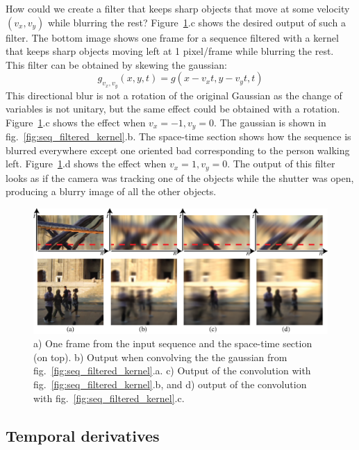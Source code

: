 How could we create a filter that keeps sharp objects that move at some velocity $(v_x,v_y)$ while blurring the rest? Figure~\ref{fig:sec_filtered_blur}.c shows the desired output of such a filter. The bottom image shows one frame for a sequence filtered with a kernel that keeps sharp objects moving left at 1 pixel/frame while blurring the rest. This filter can be obtained by skewing the gaussian:
\begin{equation}
g_{v_x,v_y}(x,y,t) = g(x - v_xt,y - v_yt, t) 
\end{equation}
This directional blur is not a rotation of the original Gaussian as the change of variables is not unitary, but the same effect could be obtained with a rotation. Figure~\ref{fig:sec_filtered_blur}.c shows the effect when $v_x=-1, v_y=0$. The gaussian is shown in fig.~\ref{fig:seq_filtered_kernel}.b. The space-time section shows how the sequence is blurred everywhere except one oriented bad corresponding to the person walking left. Figure~\ref{fig:sec_filtered_blur}.d shows the effect when $v_x=1, v_y=0$. The output of this filter looks as if the camera was tracking one of the objects while the shutter was open, producing a blurry image of all the other objects.

\begin{figure}
\includegraphics[width=1\linewidth]{figures/temporal_filters/seq_filtered_blur.eps}
\caption{a) One frame from the input sequence and the space-time section (on top). b) Output when convolving the the gaussian from fig.~\ref{fig:seq_filtered_kernel}.a. c) Output of the convolution with fig.~\ref{fig:seq_filtered_kernel}.b, and d) output of the convolution with fig.~\ref{fig:seq_filtered_kernel}.c.} 
\label{fig:sec_filtered_blur}
\end{figure}


\subsection{Temporal derivatives}

